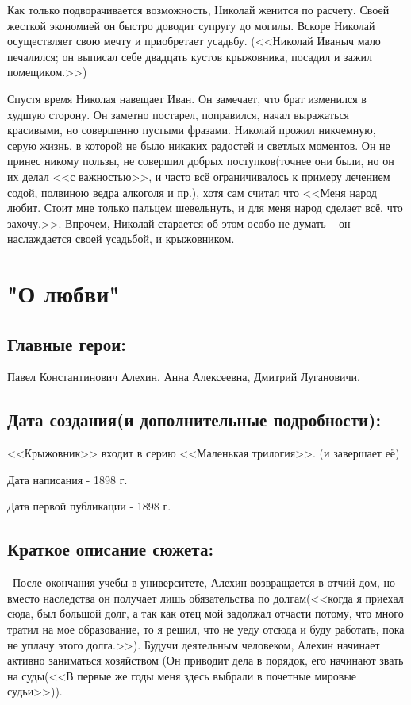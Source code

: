 \documentclass[a4paper,12pt]{article}
\begin{document}
	Как только подворачивается возможность, Николай женится по расчету. Своей жесткой экономией он быстро доводит супругу до могилы. Вскоре Николай осуществляет свою мечту и приобретает усадьбу. (<<Николай Иваныч мало печалился; он выписал себе двадцать кустов крыжовника, посадил и зажил помещиком.>>)
	
	
	Спустя время Николая навещает Иван. Он замечает, что брат изменился в худшую сторону. Он заметно постарел, поправился, начал выражаться красивыми, но совершенно пустыми фразами. Николай прожил никчемную, серую жизнь, в которой не было никаких радостей и светлых моментов. Он не принес никому пользы, не совершил добрых поступков(точнее они были, но он их делал <<с важностью>>, и часто всё ограничивалось к примеру лечением содой, полвиною ведра алкоголя и пр.), хотя сам считал что <<Меня народ любит. Стоит мне только пальцем шевельнуть, и для меня народ сделает всё, что захочу.>>. Впрочем, Николай старается об этом особо не думать – он наслаждается своей усадьбой, и крыжовником.
	
	\section{"О любви"}
	\subsection{Главные герои: }
	Павел Константинович Алехин, Анна Алексеевна, Дмитрий Лугановичи.
	\subsection{Дата создания(и дополнительные подробности): }
	<<Крыжовник>> входит в серию <<Маленькая трилогия>>. (и завершает её)
	
	\noindent
	Дата написания - 1898 г.
	
	\noindent
	Дата первой публикации - 1898 г.
	
	\subsection{Краткое описание сюжета: }
	\quad \, После окончания учебы в университете, Алехин возвращается в отчий дом, но вместо наследства он получает лишь обязательства по долгам(<<когда я приехал сюда, был большой долг, а так как отец мой задолжал отчасти потому, что много тратил на мое образование, то я решил, что не уеду отсюда и буду работать, пока не уплачу этого долга.>>). Будучи деятельным человеком, Алехин начинает активно заниматься хозяйством (Он приводит дела в порядок, его начинают звать на суды(<<В первые же годы меня здесь выбрали в почетные мировые судьи>>)).
	
\end{document}
